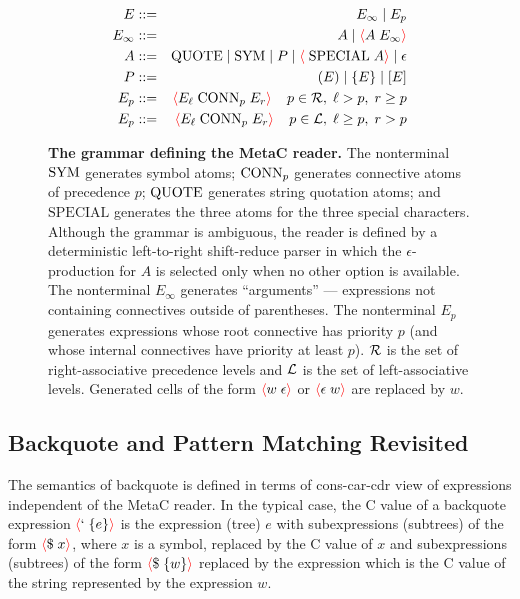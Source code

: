 \documentclass{article}
\newcommand{\fopen}{{\color{red} \langle}}
\newcommand{\fclose}{{\color{red} \rangle}}
\begin{document}
\begin{figure}
  
\begin{eqnarray*}
  E & ::= & E_\infty \;|\; E_p \\
  E_\infty & ::= & A \;|\; \fopen A \; E_\infty \fclose \\
  A & ::= & \quot \;|\; \sym \;|\; P  \;|\; \fopen \; \mathrm{SPECIAL}\;A\fclose \;|\;\epsilon \\
  P & ::= & (E) \;|\; \{E\} \;|\; [E] \\
  E_p & ::= & \fopen  E_\ell\;\conn_p \;E_r\fclose\;\;\;\;p \in {\cal R}, \;\ell > p, \; r \geq p \\
  E_p & ::= & \fopen E_\ell\;\conn_p \;E_r\fclose\;\;\;\;p \in {\cal L}, \; \ell \geq p,\; r > p
\end{eqnarray*}

\caption{{\bf The grammar defining the MetaC reader.}
The nonterminal $\mathrm{SYM}$ generates symbol atoms; $\mathrm{CONN}_p$ generates connective atoms of precedence $p$; $\mathrm{QUOTE}$ generates string quotation atoms; and $\mathrm{SPECIAL}$ generates the three atoms for the three special characters.
Although the grammar is ambiguous, the reader is defined by a deterministic left-to-right shift-reduce parser
in which the $\epsilon$-production for $A$ is selected only when no other option is available.
The nonterminal $E_\infty$ generates ``arguments'' --- expressions not containing connectives outside of parentheses.
The nonterminal $E_p$ generates expressions whose root connective has priority $p$ (and whose internal connectives have priority at least $p$).
${\cal R}$ is the set of right-associative precedence levels and ${\cal L}$ is the set of left-associative levels.
Generated cells of the form $\fopen w\;\epsilon \fclose$ or $\fopen \epsilon \;w\fclose$ are replaced by $w$.
}
\label{fig:grammar}
\end{figure}

\subsection{Backquote and Pattern Matching Revisited}

The semantics of backquote is defined in terms of cons-car-cdr view of expressions independent of the MetaC reader.
In the typical case, the C value of a backquote expression
$\fopen ` \;\{e\}\fclose$ is the expression (tree) $e$ with subexpressions (subtrees) of the form $\fopen \$\;x \fclose$, where $x$ is a symbol,
replaced by the C value of $x$
and subexpressions (subtrees) of the form $\fopen \$\;\{w\}\fclose$ replaced by the expression which is the C value of the string represented by the expression $w$.
\end{document}
